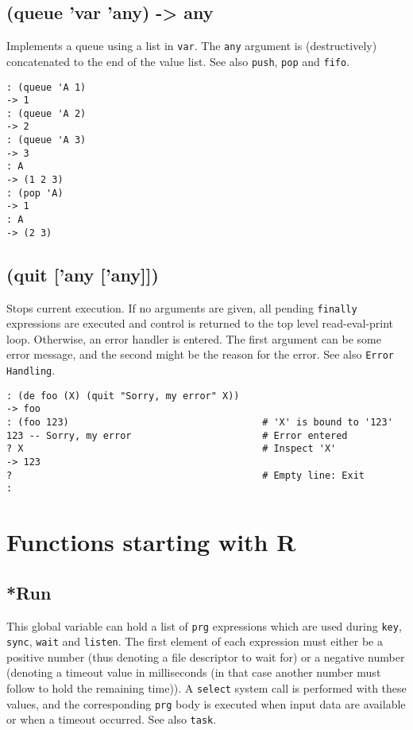{{{{{{{{ 
\section{(queue 'var 'any) -> any}
\label{sec-8-1-17-4}


Implements a queue using a list in \texttt{var}. The \texttt{any} argument is
(destructively) concatenated to the end of the value list. See also
\texttt{push}, \texttt{pop} and \texttt{fifo}.


\begin{verbatim}
: (queue 'A 1)
-> 1
: (queue 'A 2)
-> 2
: (queue 'A 3)
-> 3
: A
-> (1 2 3)
: (pop 'A)
-> 1
: A
-> (2 3)
\end{verbatim}

 
\section{(quit ['any ['any]])}
\label{sec-8-1-17-5}


Stops current execution. If no arguments are given, all pending
\texttt{finally} expressions are executed and control is returned to the top
level read-eval-print loop. Otherwise, an error handler is entered. The
first argument can be some error message, and the second might be the
reason for the error. See also \texttt{Error Handling}.


\begin{verbatim}
: (de foo (X) (quit "Sorry, my error" X))
-> foo
: (foo 123)                                  # 'X' is bound to '123'
123 -- Sorry, my error                       # Error entered
? X                                          # Inspect 'X'
-> 123
?                                            # Empty line: Exit
:
\end{verbatim}


\chapter{Functions starting with R}
\label{sec-8-1-18}


 
\section{*Run}
\label{sec-8-1-18-1}


This global variable can hold a list of \texttt{prg} expressions which are used
during \texttt{key}, \texttt{sync}, \texttt{wait} and \texttt{listen}. The first element of each
expression must either be a positive number (thus denoting a file
descriptor to wait for) or a negative number (denoting a timeout value
in milliseconds (in that case another number must follow to hold the
remaining time)). A \texttt{select} system call is performed with these values,
and the corresponding \texttt{prg} body is executed when input data are
available or when a timeout occurred. See also \texttt{task}.


}}}}}}}}
